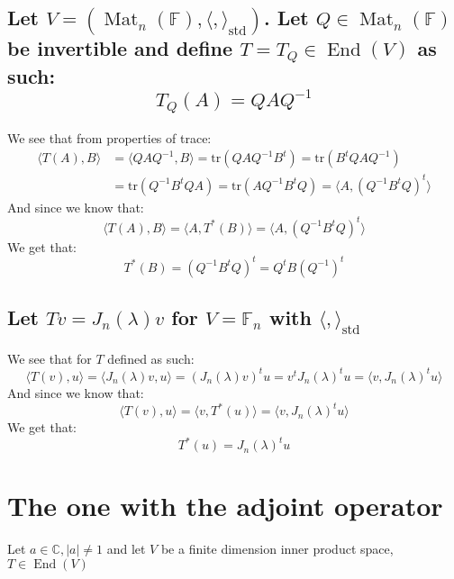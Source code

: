\documentclass[11pt,a4paper]{article}
\theoremstyle{plain}
\DeclareMathOperator{\End}{End}
\DeclareMathOperator{\Mat}{Mat}
\DeclareMathOperator{\std}{std}
\newcommand{\tr}{\text{tr}}
\newcommand{\C}{\mathbb{C}}
\newcommand{\F}{\mathbb{F}}
\begin{document}
	\newpage

	\subsection{Let $V = (\Mat_n(\F),\langle,\rangle_{\std})$. 
	Let $Q\in\Mat_n(\F)$ be invertible and define $T=T_Q\in\End(V)$ as such:
	\[
	T_Q(A) = QAQ^{-1}
	\]}
	We see that from properties of trace:
	\begin{align*}
		\langle T(A), B \rangle &= 
		\langle QAQ^{-1}, B \rangle = \tr(QAQ^{-1}B^{t}) = 
		\tr(B^{t}QAQ^{-1}) \\ &= \tr(Q^{-1}B^{t}QA) = \tr(AQ^{-1}B^{t}Q) = 
		\langle A, (Q^{-1}B^{t}Q)^{t} \rangle
	\end{align*}
	And since we know that:
	\[
		\langle T(A), B\rangle = \langle A, T^*(B)\rangle = 
		\langle A, (Q^{-1}B^{t}Q)^{t} \rangle
	\]
	We get that:
	\[
		T^*(B) = 
		(Q^{-1}B^{t}Q)^{t} = Q^{t}B(Q^{-1})^{t}
	\]

	\newpage

	\subsection{Let $Tv=J_n(\lambda)v$ for $V=\F_n$ with 
	$\langle,\rangle_{\std}$}
	We see that for $T$ defined as such:
	\[
		\langle T(v), u \rangle = 
		\langle J_n(\lambda)v, u \rangle = (J_n(\lambda)v)^{t} u = 
		v^{t} J_n(\lambda)^{t} u = \langle v, J_n(\lambda)^{t} u \rangle
	\]
	And since we know that:
	\[
		\langle T(v), u\rangle = \langle v, T^*(u)\rangle = 
		\langle v, J_n(\lambda)^{t} u \rangle
	\]
	We get that:
	\[
		T^*(u) = 
		J_n(\lambda)^{t} u
	\]
	
	\newpage
	\section{The one with the adjoint operator}
	Let $a\in\C, |a| \neq 1$ and let $V$ be a finite dimension inner product
	space, $T\in\End(V)$
\end{document}
